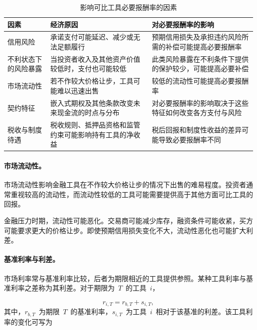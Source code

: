 \begin{table}[htbp]
\centering
\caption{影响可比工具必要报酬率的因素}
\label{tab:ch6-rate-differences}

\begin{tabularx}{\textwidth}{@{}p{3.2cm}Y Y@{}}
\toprule
\textbf{因素} &
\textbf{经济原因} &
\textbf{对必要报酬率的影响} \\
\midrule

信用风险 & 承诺支付可能延迟、减少或无法足额履行 & 预期信用损失及承担违约风险所需的补偿可能提高必要报酬率 \\

不利状态下的风险暴露 & 当投资者收入及其他资产价值较低时，支付也可能较低 & 此类风险暴露在不利条件下提供的保护较少，可能提高必要补偿 \\

市场流动性 & 若不作较大价格让步，工具可能难以迅速出售 & 较低的流动性可能提高必要报酬率 \\

契约特征 & 嵌入式期权及其他条款改变未来现金流的时点与分布 & 对必要报酬率的影响取决于这些特征如何改变各方支付与风险 \\

税收与制度待遇 & 税收规则、抵押品资格和监管约束可能影响持有工具的净收益 & 税后回报和制度性收益的差异可能导致必要报酬率不同 \\

\bottomrule
\end{tabularx}
\end{table}

\paragraph{市场流动性。}

市场流动性影响金融工具在不作较大价格让步的情况下出售的难易程度。投资者通常重视较高的流动性，而流动性较低的工具可能需要提供高于其他方面可比工具的回报。

金融压力时期，流动性可能恶化。交易商可能减少库存，融资条件可能收紧，买方可能要求更大的价格让步。即使预期信用损失变化不大，流动性恶化也可能扩大利差。

\paragraph{基准利率与利差。}

市场利率常与基准利率比较，后者为期限相近的工具提供参照。某种工具利率与基准利率之差称为其利差。对于期限为~$T$~的工具~$i$，

\begin{equation}
r_{i,T}=r_{b,T}+s_{i,T},
\label{eq:ch6-benchmark-spread}
\end{equation}
其中，$r_{b,T}$~为期限~$T$~的基准利率，$s_{i,T}$~为工具~$i$~相对于该基准的利差。该工具利率的变化可写为

